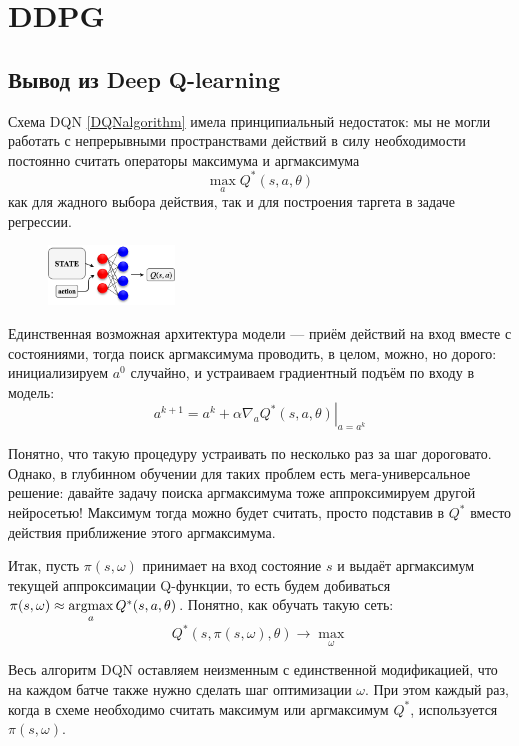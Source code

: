 
\section{DDPG}\label{DDPGsection}

\subsection{Вывод из Deep Q-learning}

Схема DQN \ref{DQNalgorithm} имела принципиальный недостаток: мы не могли работать с непрерывными пространствами действий в силу необходимости постоянно считать операторы максимума и аргмаксимума
$$\max_a Q^*(s, a, \theta)$$
как для жадного выбора действия, так и для построения таргета в задаче регрессии. 

\begin{figure}
\vspace{-0.3cm}
\centering
\includegraphics[width=0.3\textwidth]{Images/Qnetwork1.png}
\vspace{-0.3cm}
\end{figure}

Единственная возможная архитектура модели --- приём действий на вход вместе с состояниями, тогда поиск аргмаксимума проводить, в целом, можно, но дорого: инициализируем $a^0$ случайно, и устраиваем градиентный подъём по входу в модель:
$$a^{k+1} = a^k + \alpha \left. \nabla_a Q^*(s, a, \theta) \right|_{a = a^k}$$

Понятно, что такую процедуру устраивать по несколько раз за шаг дороговато. Однако, в глубинном обучении для таких проблем есть мега-универсальное решение: давайте задачу поиска аргмаксимума тоже аппроксимируем другой нейросетью! Максимум тогда можно будет считать, просто подставив в $Q^*$ вместо действия приближение этого аргмаксимума.

Итак, пусть $\pi(s, \omega)$ принимает на вход состояние $s$ и выдаёт аргмаксимум текущей аппроксимации Q-функции, то есть будем добиваться $\pi(s, \omega) \HM\approx \argmax\limits_a Q^*(s, a, \theta)$. Понятно, как обучать такую сеть:
$$Q^*(s, \pi(s, \omega), \theta) \to \max_{\omega}$$

Весь алгоритм DQN оставляем неизменным с единственной модификацией, что на каждом батче также нужно сделать шаг оптимизации $\omega$. При этом каждый раз, когда в схеме необходимо считать максимум или аргмаксимум $Q^*$, используется $\pi(s, \omega)$.

